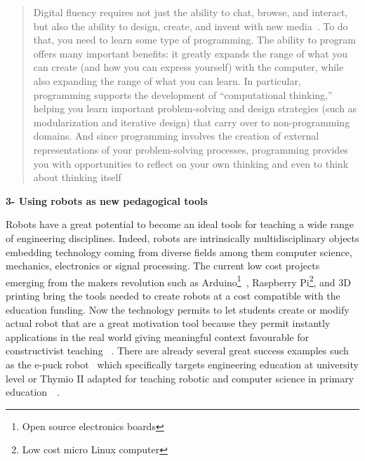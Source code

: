 \begin{quotation}
    Digital fluency requires not just the ability to chat, browse, and interact, but also the ability to design, create, and invent with new media~\cite{resnick2008sowing}. To do that, you need to learn some type of programming. The ability to program offers many important benefits: it greatly expands the range of what you can create (and how you can express yourself) with the computer, while also expanding the range of what you can learn. In particular, programming supports the development of “computational thinking,” helping you learn important problem-solving and design strategies (such as modularization and iterative design) that carry over to non-programming domains. And since programming involves the creation of external representations of your problem-solving processes, programming provides you with opportunities to reflect on your own thinking and even to think about thinking itself~\cite{disessa2001changing}


\end{quotation}


\textbf{3- Using robots as new pedagogical tools}

Robots have a great potential to become an ideal tools for teaching a wide range of engineering disciplines. Indeed, robots are intrinsically multidisciplinary objects embedding technology coming from diverse fields among them computer science, mechanics, electronics or signal processing.
The current low cost projects emerging from the makers revolution\cite{anderson} such as Arduino\footnote{Open source electronics boards}~\cite{mellis2007arduino}, Raspberry Pi\footnote{Low cost micro Linux computer}, and 3D printing bring the tools needed to create robots at a cost compatible with the education funding. Now the technology permits to let students create or modify actual robot that are a great motivation tool because they permit instantly applications in the real world giving meaningful context favourable for constructivist teaching~\cite{palincsar1998social} \cite{papert1991situating}.
There are already several great success examples such as the e-puck robot~\cite{mondada2009puck} which specifically targets engineering education at university level or Thymio II adapted for teaching robotic and computer science in primary education~\cite{riedo2012two}~\cite{riedo2013thymio}.



